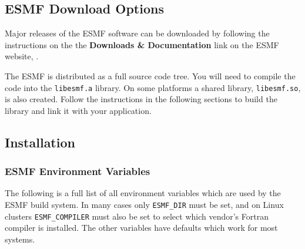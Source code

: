
\subsection{ESMF Download Options}

Major releases of the ESMF software can be downloaded by following
the instructions on the 
the {\bf Downloads \& Documentation} link on the ESMF 
website, .

The ESMF is distributed as a full source code tree.  You will need
to compile the code into the {\tt libesmf.a} library.
On some platforms a shared library, {\tt libesmf.so}, is also created.
Follow the instructions in the following sections
to build the library and link it with your application.

\subsection{Installation}
\label{InstallProcedures}



\subsubsection{ESMF Environment Variables}
\label{EnvironmentVariables}

The following is a full list of all environment variables which
are used by the ESMF build system.  In many cases only {\tt ESMF\_DIR}
must be set, and on Linux clusters {\tt ESMF\_COMPILER} must also be
set to select which vendor's Fortran compiler is installed.
The other variables have defaults which work for most systems.

